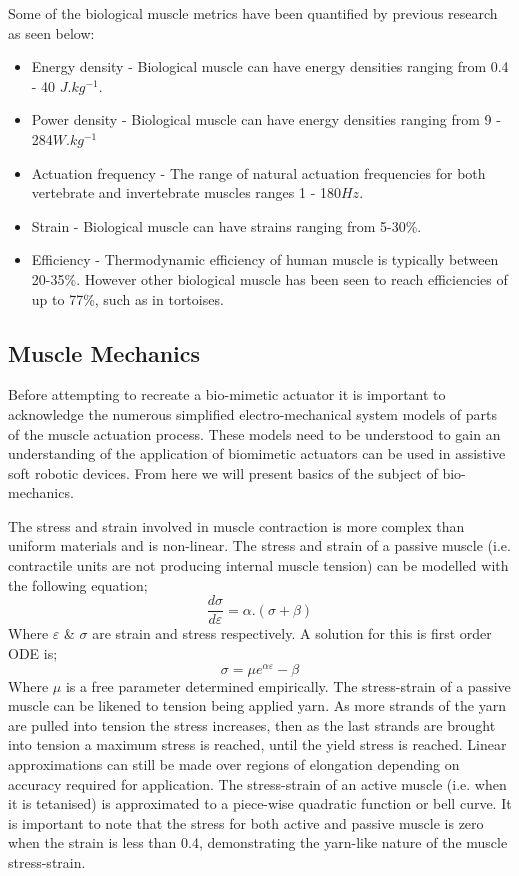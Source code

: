 Some of the biological muscle metrics have been quantified by previous research as seen below:
\begin{itemize}
    \item Energy density - Biological muscle can have energy densities ranging from 0.4 - 40 $J.kg^{-1}$\citep{Alexander1977}.
    \item Power density - Biological muscle can have energy densities ranging from 9 - 284$W.kg^{-1}$\citep{Full2004}
    \item Actuation frequency - The range of natural actuation frequencies for both vertebrate and invertebrate muscles ranges 1 - 180$Hz$\citep{Full2004}.
    \item Strain - Biological muscle can have strains ranging from 5-30\%\citep{Duduta2019}.
    \item Efficiency - Thermodynamic efficiency of human muscle is typically between 20-35\%\citep{Smith2005}. However other biological muscle has been seen to reach efficiencies of up to 77\%, such as in tortoises\citep{Smith2005}.
\end{itemize}
    

\subsection{Muscle Mechanics}
Before attempting to recreate a bio-mimetic actuator it is important to acknowledge the numerous simplified electro-mechanical system models of parts of the muscle actuation process. These models need to be understood to gain an understanding of the application of biomimetic actuators can be used in assistive soft robotic devices. From here we will present basics of the subject of bio-mechanics.

The stress and strain involved in muscle contraction is more complex than uniform materials and is non-linear. The stress and strain of a passive muscle (i.e. contractile units are not producing internal muscle tension) can be modelled with the following equation; 
\begin{equation}
    \frac{d\sigma}{d\varepsilon} =  \alpha.(\sigma+\beta)
\end{equation}
Where $\varepsilon$ \& $\sigma$ are strain and stress respectively. A solution for this is first order ODE is; 
\begin{equation}
    \sigma = \mu e^{\alpha\varepsilon} - \beta
\end{equation}
Where $\mu$ is a free parameter determined empirically. The stress-strain of a passive muscle can be likened to tension being applied yarn. As more strands of the yarn are pulled into tension the stress increases, then as the last strands are brought into tension a maximum stress is reached, until the yield stress is reached. Linear approximations can still be made over regions of elongation depending on accuracy required for application. The stress-strain of an active muscle (i.e. when it is tetanised) is approximated to a piece-wise quadratic function or bell curve. It is important to note that the stress for both active and passive muscle is zero when the strain is less than 0.4, demonstrating the yarn-like nature of the muscle stress-strain.

